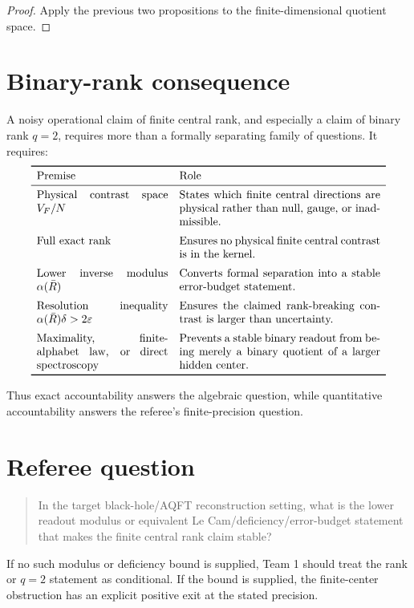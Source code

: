 \documentclass[12pt]{article}
\theoremstyle{remark}
\begin{document}
\begin{proof}
Apply the previous two propositions to the finite-dimensional quotient space.
\end{proof}

\section{Binary-rank consequence}

A noisy operational claim of finite central rank, and especially a claim of
binary rank \(q=2\), requires more than a formally separating family of
questions.  It requires:
\[
\begin{array}{p{0.34\linewidth}p{0.52\linewidth}}
\toprule
Premise & Role \\
\midrule
Physical contrast space \(V_F/N\) & States which finite central directions are
physical rather than null, gauge, or inadmissible. \\
\addlinespace
Full exact rank & Ensures no physical finite central contrast is in the
kernel. \\
\addlinespace
Lower inverse modulus \(\alpha(\bar R)\) & Converts formal separation into a
stable error-budget statement. \\
\addlinespace
Resolution inequality \(\alpha(\bar R)\delta>2\varepsilon\) & Ensures the
claimed rank-breaking contrast is larger than uncertainty. \\
\addlinespace
Maximality, finite-alphabet law, or direct spectroscopy & Prevents a stable
binary readout from being merely a binary quotient of a larger hidden center.
\\
\bottomrule
\end{array}
\]

Thus exact accountability answers the algebraic question, while quantitative
accountability answers the referee's finite-precision question.

\section{Referee question}

\begin{quote}
In the target black-hole/AQFT reconstruction setting, what is the lower
readout modulus or equivalent Le Cam/deficiency/error-budget statement that
makes the finite central rank claim stable?
\end{quote}

If no such modulus or deficiency bound is supplied, Team 1 should treat the
rank or \(q=2\) statement as conditional.  If the bound is supplied, the
finite-center obstruction has an explicit positive exit at the stated
precision.
\end{document}
